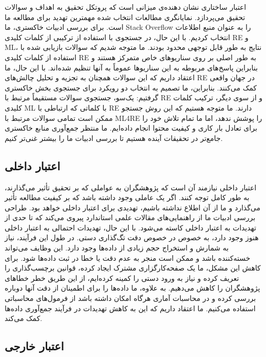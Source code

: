 \documentclass[a4paper,10pt]{article}
\begin{document}
            اعتبار ساختاری نشان دهنده‌ی میزانی است که پروتکل تحقیق به اهداف و سوالات تحقیق می‌پردازد. نمایانگری مطالعات انتخاب شده مهمترین تهدید برای مطالعه ما است. برای بررسی ادبیات خاکستری، ما Stack Overflow را به عنوان منبع اطلاعات انتخاب کردیم. با این حال، در جستجوی با استفاده از ترکیبی از کلمات کلیدی RE و ML، نتایج به طور قابل توجهی محدود بودند. ما متوجه شدیم که سوالات بازیابی شده با استفاده از کلمات کلیدی RE به طور اصلی بر روی سناریوهای خاص متمرکز هستند و بنابراین پاسخ‌های مربوطه به این سناریوها عموماً به آنها تنظیم شده‌اند. با این حال، ما اعتقاد داریم که این سوالات همچنان به تجزیه و تحلیل چالش‌های RE در جهان واقعی کمک می‌کنند. بنابراین، ما تصمیم به انتخاب دو رویکرد برای جستجوی بخش خاکستری گرفتیم: یک‌سو، جستجوی سوالات مستقیماً مرتبط با RE و از سوی دیگر، ترکیب کلمات کلیدی ML با کلماتی که ارتباطی با RE دارند. ما متوجه هستیم که این روش جستجو ممکن است تمامی سوالات مرتبط با ML4RE را پوشش ندهد، اما ما تمام تلاش خود را برای تعادل بار کاری و کیفیت محتوا انجام داده‌ایم. ما منتظر جمع‌آوری منابع خاکستری جامع‌تر در تحقیقات آینده هستیم تا بررسی ادبیات ما را بیشتر غنی‌تر کنیم.
        
        \subsection{اعتبار داخلی}

            اعتبار داخلی نیازمند آن است که پژوهشگران به عواملی که بر تحقیق تأثیر می‌گذارند، به طور کامل توجه کنند. اگر یک عاملی وجود داشته باشد که بر کیفیت مطالعه تأثیر می‌گذارد و ما از آن اطلاع نداشته باشیم، تهدیدی برای اعتبار داخلی خواهد بود. طراحی بررسی ادبیات ما از راهنمایی‌های مقالات علمی استاندارد پیروی می‌کند که تا حدی از تهدیدات به اعتبار داخلی کاسته می‌شود. با این حال، تهدیدات احتمالی به اعتبار داخلی هنوز وجود دارد، به خصوص در خصوص دقت تگ‌گذاری دستی. در طول این فرآیند، نیاز به شمارش و استخراج حجم زیادی از داده‌ها وجود دارد. این وظایف می‌تواند خسته‌کننده باشد و ممکن است منجر به عدم دقت یا خطا در ثبت داده‌ها شود. برای کاهش این مشکل، ما یک صفحه‌کارگزاری مشترک ایجاد کرده، قوانین برچسب‌گذاری را تعریف کرده و نیاز به ورود دستی را کمینه کرده‌ایم، از این طریق خطر خطاهای پژوهشگران را کاهش می‌دهیم. به علاوه، ما داده‌ها را برای اطمینان از دقت آنها دوباره بررسی کرده و در محاسبات آماری هرگاه امکان داشته باشد از فرمول‌های محاسباتی استفاده می‌کنیم. ما اعتقاد داریم که این به کاهش تهدیدات در فرآیند جمع‌آوری داده‌ها کمک می‌کند.

        \subsection{اعتبار خارجی}
\end{document}
